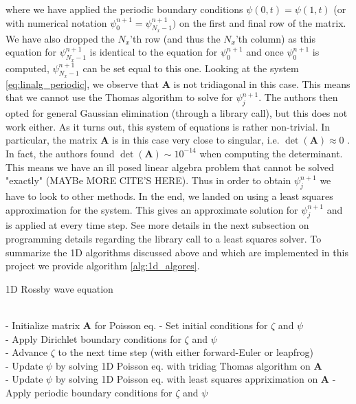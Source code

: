 \documentclass[12pt]{article}
\numberwithin{figure}{section}
\numberwithin{table}{section}
\begin{document}
where we have applied the periodic boundary conditions $\psi(0,t)=\psi(1,t)$ (or with numerical notation $\psi_0^{n+1}=\psi_{N_x-1}^{n+1})$ on the first and final row of the matrix. We have also dropped the $N_x$'th row (and thus the $N_x$'th column) as this equation for $\psi_{N_x-1}^{n+1}$ is identical to the equation for $\psi_0^{n+1}$ and once $\psi_0^{n+1}$ is computed, $\psi_{N_x-1}^{n+1}$ can be set equal to this one. Looking at the system \eqref{eq:linalg_periodic}, we observe that $\mathbf{A}$ is not tridiagonal in this case. This means that we cannot use the Thomas algorithm to solve for $\psi_j^{n+1}$. The authors then opted for general Gaussian elimination (through a library call), but this does not work either. As it turns out, this system of equations is rather non-trivial. In particular, the matrix $\mathbf{A}$ is in this case very close to singular, i.e. $\det(\mathbf{A})\approx 0$ \cite{LinAlg}. In fact, the authors found $\det(\mathbf{A})\sim 10^{-14}$ when computing the determinant. This means we have an ill posed linear algebra problem that cannot be solved "exactly" (MAYBe MORE CITE'S HERE). Thus in order to obtain $\psi_j^{n+1}$ we have to look to other methods. In the end, we landed on using a least squares approximation for the system. This gives an approximate solution for $\psi_j^{n+1}$ and is applied at every time step. See more details in the next subsection on programming details regarding the library call to a least squares solver. To summarize the 1D algorithms discussed above and which are implemented in this project we provide algorithm \ref{alg:1d_algores}.

\begin{algorithm}
\caption{1D Rossby wave equation} \label{alg:1d_algores}
\begin{algorithmic}[1000] \\
	\State - Initialize matrix $\mathbf{A}$ for Poisson eq.
    \State - Set initial conditions for $\zeta$ and $\psi$ \\
    	\State - Apply Dirichlet boundary conditions for $\zeta$ and $\psi$
    \EndIf \\
    	\State - Advance $\zeta$ to the next time step (with either forward-Euler or leapfrog) \\
        
        	\State - Update $\psi$ by solving 1D Poisson eq. with tridiag Thomas algorithm on $\mathbf{A}$
    	\EndIf \\
        
        	\State - Update $\psi$ by solving 1D Poisson eq. with least squares appriximation on $\mathbf{A}$
    		\State - Apply periodic boundary conditions for $\zeta$ and $\psi$
    	\EndIf
    \EndWhile
\end{algorithmic}
\end{algorithm}
\end{document}

